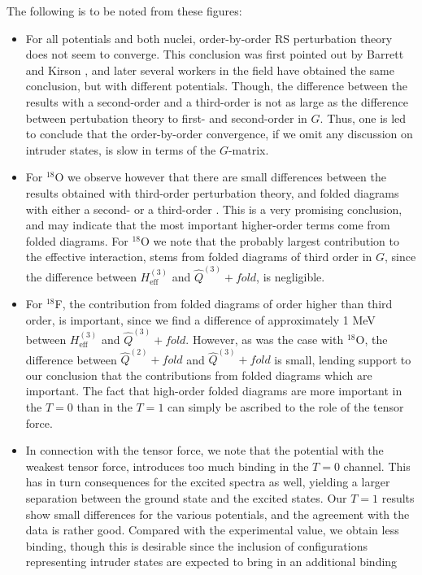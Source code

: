 The following is to be noted from these figures:
\begin{itemize}
\item For all potentials and both nuclei, order-by-order
RS perturbation theory does not seem to converge. This conclusion
was first pointed out by Barrett and Kirson \cite{bk70},
and later several workers in the field have obtained the same
conclusion, but with different potentials. Though, the difference
between the results with a second-order and a third-order
\qbox is not as large as the difference between pertubation
theory to first- and second-order in $G$. Thus, one is led
to conclude that the order-by-order convergence, if we
omit any discussion on intruder states, is slow in terms of the
$G$-matrix.
\item For $^{18}$O we observe however that there are small
differences between the results obtained with third-order
perturbation theory, and folded diagrams with either a
second- or a third-order \qbox. This is a very promising
conclusion, and may indicate that the most important higher-order
terms come from folded diagrams. For $^{18}$O we note that
the probably largest contribution to the effective interaction,
stems from folded diagrams of third order in $G$, since the
difference between
$H_{\mathrm{eff}}^{(3)}$ and $\hat{Q}^{(3)}+fold$, is negligible.
\item For $^{18}$F, the contribution from folded diagrams
of order higher than third order, is important, since we find a difference
of approximately 1 MeV between
$H_{\mathrm{eff}}^{(3)}$ and $\hat{Q}^{(3)}+fold$. However, as
was the case with $^{18}$O, the difference between
$\hat{Q}^{(2)}+fold$ and $\hat{Q}^{(3)}+fold$ is small, lending
support to our conclusion that the contributions from folded diagrams
which are important. The fact that high-order folded diagrams are
more important in the $T=0$ than in the $T=1$ can simply be
ascribed to the role of the tensor force.
\item In connection with the tensor force, we note that the potential
with the weakest tensor force, introduces too much binding in the
$T=0$ channel. This has in turn consequences for the
excited spectra as well, yielding a larger separation
between the ground state and the excited states.
Our $T=1$ results show small differences for the various potentials,
and the agreement with the data is rather good. Compared with the
experimental value, we obtain less binding, though this is
desirable since the inclusion of configurations representing
intruder states are expected to bring in an additional binding

\end{itemize}
